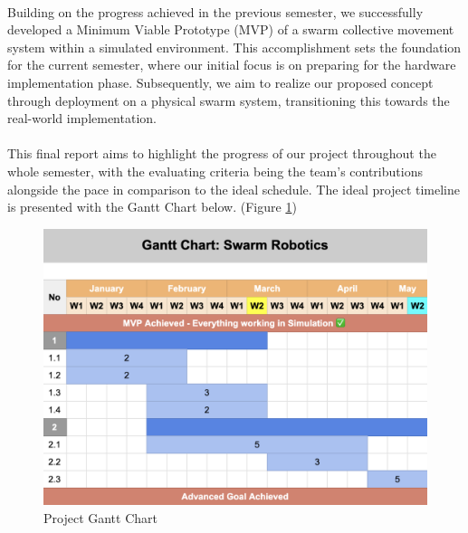 \paragraph*{}
Building on the progress achieved in the previous semester, we successfully developed a Minimum Viable Prototype (MVP) of a swarm collective movement system within a simulated environment. This accomplishment sets the foundation for the current semester, where our initial focus is on preparing for the hardware implementation phase. Subsequently, we aim to realize our proposed concept through deployment on a physical swarm system, transitioning this towards the real-world implementation.

\paragraph*{}
This final report aims to highlight the progress of our project throughout the whole semester, with the evaluating criteria being the team's contributions alongside the pace in comparison to the ideal schedule. The ideal project timeline is presented with the Gantt Chart below. (Figure \ref{fig:gantt-chart})

\begin{figure} [H]
    \centering
    \includegraphics[width=1\linewidth]{assets/images/timeline/gantt_chart.png}
    \caption{Project Gantt Chart}
    \label{fig:gantt-chart}
\end{figure}

